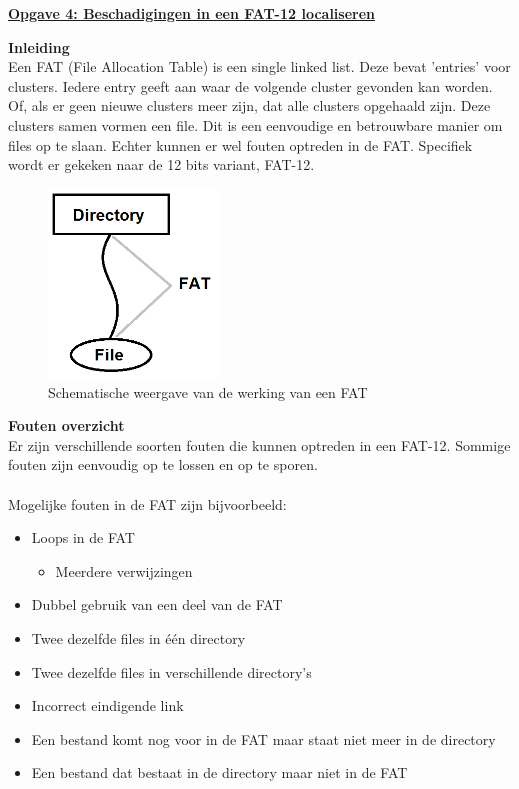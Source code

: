 \documentclass[11pt]{article}
\begin{document}
	\begin{center}
		\textbf{\underline{\large Opgave 4: Beschadigingen in een FAT-12 localiseren}}
	\end{center}
	\textbf{Inleiding}\\
	Een FAT (File Allocation Table) is een single linked list. Deze bevat 'entries' voor clusters. Iedere entry geeft aan waar de volgende cluster gevonden kan worden. Of, als er geen nieuwe clusters meer zijn, dat alle clusters opgehaald zijn. Deze clusters samen vormen een file. Dit is een eenvoudige en betrouwbare manier om files op te slaan. Echter kunnen er wel fouten optreden in de FAT. Specifiek wordt er gekeken naar de 12 bits variant, FAT-12.
	\begin{figure}[h]
		\begin{center}
		\includegraphics[width=0.4\textwidth]{fatgoed.png}
		\caption{Schematische weergave van de werking van een 	FAT}
		\end{center}
	\end{figure}
	\newpage
	\textbf{Fouten overzicht}\\
	Er zijn verschillende soorten fouten die kunnen optreden in een FAT-12. Sommige fouten zijn eenvoudig op te lossen en op te sporen.\\\\
	Mogelijke fouten in de FAT zijn bijvoorbeeld:
	\begin{itemize}
		\item Loops in de FAT
		\begin{itemize}
			\item Meerdere verwijzingen 
		\end{itemize}
		\item Dubbel gebruik van een deel van de FAT
		\item Twee dezelfde files in \'e\'en directory
		\item Twee dezelfde files in verschillende directory's
		\item Incorrect eindigende link
		\item Een bestand komt nog voor in de FAT maar staat niet meer in de directory
		\item Een bestand dat bestaat in de directory maar niet in de FAT
	\end{itemize}
	
\end{document}
